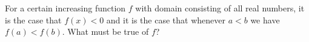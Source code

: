 \documentclass{ximera}
\begin{document}
\begin{problem}

  For a certain increasing function $f$ with domain consisting of all
  real numbers, it is the case that $f(x) < 0$ and it is the case that
  whenever $a < b$ we have $f(a) < f(b)$.  What must be true of $f$?
  \begin{multipleChoice}
  \end{multipleChoice}
\end{problem}
\end{document}
